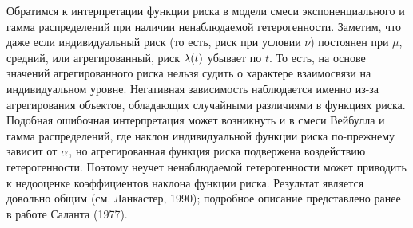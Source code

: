 Обратимся к интерпретации функции риска в модели смеси экспоненциального и гамма распределений при наличии ненаблюдаемой гетерогенности. Заметим, что даже если индивидуальный риск (то есть, риск при условии $\nu$) постоянен при $\mu$, средний, или агрегированный, риск $\lambda(t)$ убывает по $t$. То есть, на основе значений агрегированного риска нельзя судить о характере взаимосвязи на индивидуальном уровне. Негативная зависимость наблюдается именно из-за агрегирования объектов, обладающих случайными различиями в функциях риска. Подобная ошибочная интерпретация может возникнуть и в смеси Вейбулла и гамма распределений, где наклон индивидуальной функции риска по-прежнему зависит от $\alpha$, но агрегированная функция риска подвержена воздействию гетерогенности. Поэтому неучет ненаблюдаемой гетерогенности может приводить к недооценке коэффициентов наклона функции риска. Результат является довольно общим (см. Ланкастер, 1990); подробное описание представлено ранее в работе Саланта (1977).


